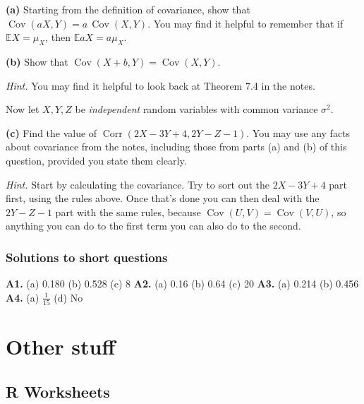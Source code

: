 \documentclass[
  a4paper,
]{book}
\theoremstyle{definition}
\theoremstyle{definition}
\theoremstyle{definition}
\theoremstyle{definition}
\theoremstyle{remark}
\begin{document}
\textbf{(a)} Starting from the definition of covariance, show that \(\operatorname{Cov}(aX, Y) = a\,\operatorname{Cov}(X,Y)\). You may find it helpful to remember that if \(\mathbb EX = \mu_X\), then \(\mathbb EaX = a\mu_X\).

\textbf{(b)} Show that \(\operatorname{Cov}(X + b, Y) = \operatorname{Cov}(X, Y)\).

\begin{myanswers}
\emph{Hint.} You may find it helpful to look back at Theorem 7.4 in the notes.

\end{myanswers}

Now let \(X, Y, Z\) be \emph{independent} random variables with common variance \(\sigma^2\).

\textbf{(c)} Find the value of \(\operatorname{Corr}(2X - 3Y + 4, 2Y - Z - 1)\). You may use any facts about covariance from the notes, including those from parts (a) and (b) of this question, provided you state them clearly.

\begin{myanswers}
\emph{Hint.} Start by calculating the covariance. Try to sort out the \(2X - 3Y + 4\) part first, using the rules above. Once that's done you can then deal with the \(2Y - Z -1\) part with the same rules, because \(\operatorname{Cov}(U, V) = \operatorname{Cov}(V,U)\), so anything you can do to the first term you can also do to the second.

\end{myanswers}

\hypertarget{P4-short-sols}{%
\section*{Solutions to short questions}\label{P4-short-sols}}

\textbf{A1.} (a) 0.180 (b) 0.528 (c) 8 \textbf{A2.} (a) 0.16 (b) 0.64 (c) 20 \textbf{A3.} (a) 0.214 (b) 0.456 \textbf{A4.} (a) \(\frac{1}{15}\) (d) No

\hypertarget{part-other-stuff}{%
\part*{Other stuff}\label{part-other-stuff}}

\hypertarget{R}{%
\chapter*{R Worksheets}\label{R}}
\end{document}
